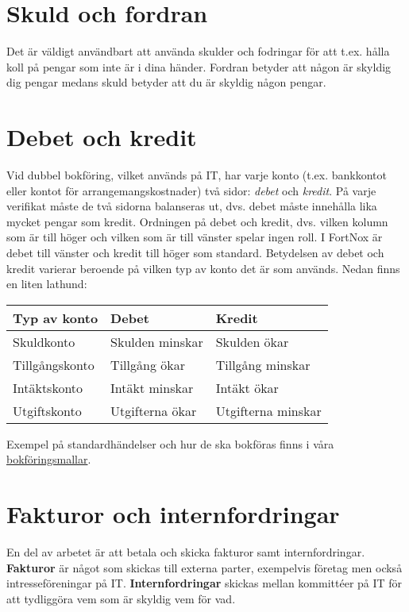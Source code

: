 \documentclass{article}
\begin{document}
\section{Skuld och fordran}
Det är väldigt användbart att använda skulder och fodringar för att t.ex. hålla koll på pengar
som inte är i dina händer. Fordran betyder att någon är skyldig dig pengar medans skuld
betyder att du är skyldig någon pengar.

\section{Debet och kredit}
\label{sec:debit-kredit}
Vid dubbel bokföring, vilket används på IT, har varje konto (t.ex. bankkontot eller kontot för
arrangemangskostnader) två sidor: \textit{debet} och \textit{kredit}. På varje verifikat måste de två sidorna
balanseras ut, dvs. debet måste innehålla lika mycket pengar som kredit. Ordningen på debet
och kredit, dvs. vilken kolumn som är till höger och vilken som är till vänster spelar ingen
roll. I FortNox är debet till vänster och kredit till höger som standard.
Betydelsen av debet och kredit varierar beroende på vilken typ av konto det är som
används. Nedan finns en liten lathund:


\begin{tabular}{ l | l | l }
\hline
Typ av konto & Debet & Kredit \\
\hline
Skuldkonto & Skulden minskar & Skulden ökar \\
Tillgångskonto & Tillgång ökar & Tillgång minskar \\
Intäktskonto & Intäkt minskar & Intäkt ökar \\
Utgiftskonto & Utgifterna ökar & Utgifterna minskar
\end{tabular}

Exempel på standardhändelser och hur de ska bokföras finns i våra \href{https://styrit.chalmers.it/wp-content/uploads/bokforingsmall.pdf}{bokföringsmallar}. 

\section{Fakturor och internfordringar}
\label{sec:faktura}
En del av arbetet är att betala och skicka fakturor samt internfordringar. \textbf{Fakturor} är något som skickas till externa parter, exempelvis företag men också intresseföreningar på IT. \textbf{Internfordringar} skickas mellan kommittéer på IT för att tydliggöra vem som är skyldig vem för vad.
\end{document}
